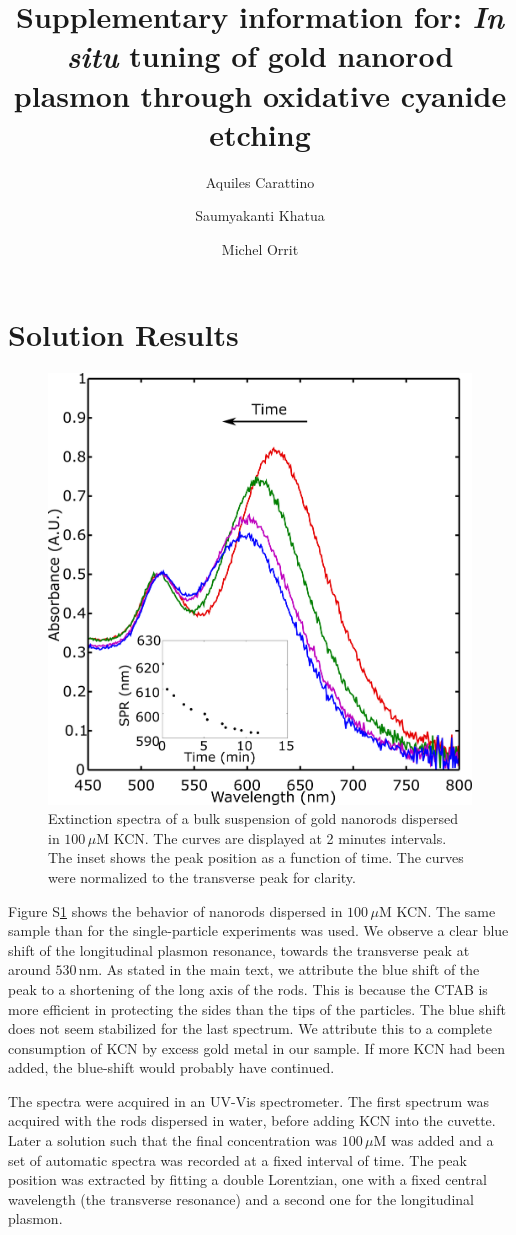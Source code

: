 \documentclass[journal=jpccck]{achemso}
\author{Aquiles Carattino}
\affiliation[Leiden]
{Huygens-Kamerlingh Onnes, Leiden, The Netherlands}
\author{Saumyakanti Khatua}
\affiliation{Indian Institute of Technology- Gandhinagar, Ahmedabad,  India}
\author{Michel Orrit}
\affiliation[Leiden]
{Huygens-Kamerlingh Onnes, Leiden, The Netherlands}
\title{Supplementary information for: \textit{In situ} tuning of gold nanorod plasmon through oxidative cyanide
etching}
\newcommand{\nm}{\ensuremath{\,\textrm{nm}}}
\newcommand{\uM}{\ensuremath{\,\mu\textrm{M}}}
\begin{document}
\maketitle

\section{Solution Results}
\begin{figure}[htp]
 \centering
 \includegraphics[width=0.45\linewidth]{Figures/04_Supporting/01_Bulk/01_bulk.png}
 \caption{Extinction spectra of a bulk suspension of gold nanorods dispersed in
 $100\uM$ KCN. The curves are displayed at 2 minutes intervals. The
 inset shows the peak position as a function of time. The curves were normalized
 to the transverse peak for clarity.}
 \label{fig:Bulk}
\end{figure}

Figure S\ref{fig:Bulk} shows the behavior of nanorods dispersed in $100\uM$ KCN.
The same sample than for the single-particle experiments was used.
We observe a clear blue shift of the longitudinal plasmon resonance, towards the
transverse peak at around $530\nm$. As stated in the main text, we attribute the
blue shift of the peak to a shortening of the long axis of the rods. This is
because the CTAB is more efficient in protecting the sides than the tips of the
particles. The blue shift does not seem stabilized for the last spectrum. We
attribute this to a complete consumption of KCN by excess gold metal in our
sample. If more KCN had been added, the blue-shift would probably have
continued.

The spectra were acquired in an UV-Vis spectrometer. The first spectrum was
acquired with the rods dispersed in water, before adding KCN into the cuvette.
Later a solution such that the final concentration was $100\uM$ was added and a
set of automatic spectra was recorded at a fixed interval of time. The peak
position was extracted by fitting a double Lorentzian, one with a fixed central
wavelength (the transverse resonance) and a second one for the longitudinal
plasmon.
\end{document}
